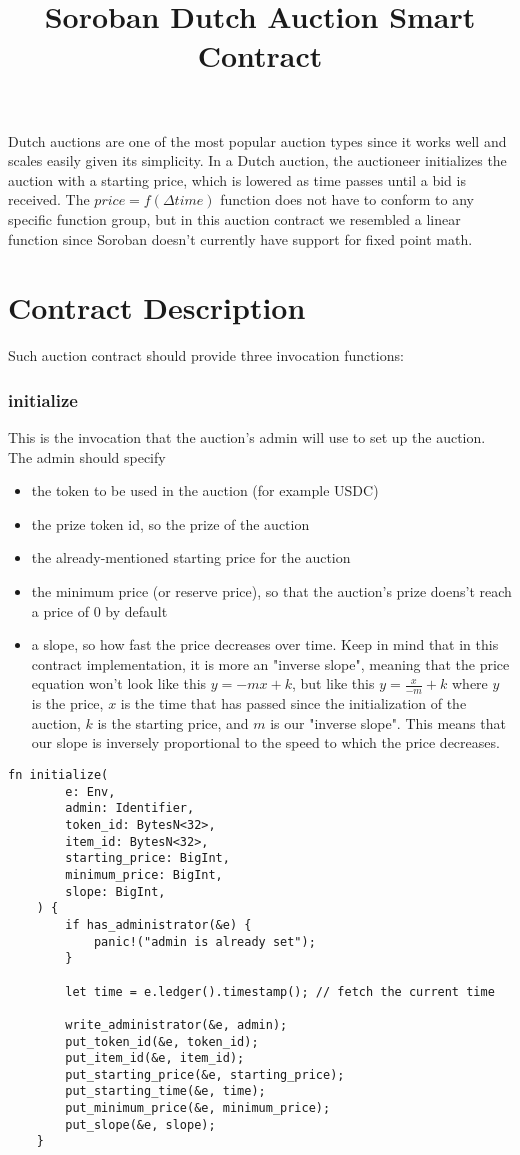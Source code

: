 \documentclass[10pt]{article}
\title{Soroban Dutch Auction Smart Contract}
\author{}
\date{}
\begin{document}
\maketitle
Dutch auctions are one of the most popular auction types since it works well and scales easily given its simplicity. In a Dutch auction, the auctioneer initializes the auction with a starting price, which is lowered as time passes until a bid is received. The $price = f(\Delta time)$ function does not have to conform to any specific function group, but in this auction contract we resembled a linear function since Soroban doesn't currently have support for fixed point math.

\section*{Contract Description}
Such auction contract should provide three invocation functions:

\subsubsection*{initialize}
This is the invocation that the auction's admin will use to set up the auction. The admin should specify

\begin{itemize}
  \item the token to be used in the auction (for example USDC)
  \item the prize token id, so the prize of the auction
  \item the already-mentioned starting price for the auction
  \item the minimum price (or reserve price), so that the auction's prize doens't reach a price of 0 by default
  \item a slope, so how fast the price decreases over time. Keep in mind that in this contract implementation, it is more an "inverse slope", meaning that the price equation won't look like this $y = -mx + k$, but like this $y = \frac{x}{-m} + k$ where $y$ is the price, $x$ is the time that has passed since the initialization of the auction, $k$ is the starting price, and $m$ is our "inverse slope". This means that our slope is inversely proportional to the speed to which the price decreases.
\end{itemize}

\begin{verbatim}
fn initialize(
        e: Env,
        admin: Identifier,
        token_id: BytesN<32>,
        item_id: BytesN<32>,
        starting_price: BigInt,
        minimum_price: BigInt,
        slope: BigInt,
    ) {
        if has_administrator(&e) {
            panic!("admin is already set");
        }

        let time = e.ledger().timestamp(); // fetch the current time

        write_administrator(&e, admin);
        put_token_id(&e, token_id);
        put_item_id(&e, item_id);
        put_starting_price(&e, starting_price);
        put_starting_time(&e, time);
        put_minimum_price(&e, minimum_price);
        put_slope(&e, slope);
    }
\end{verbatim}
\end{document}
